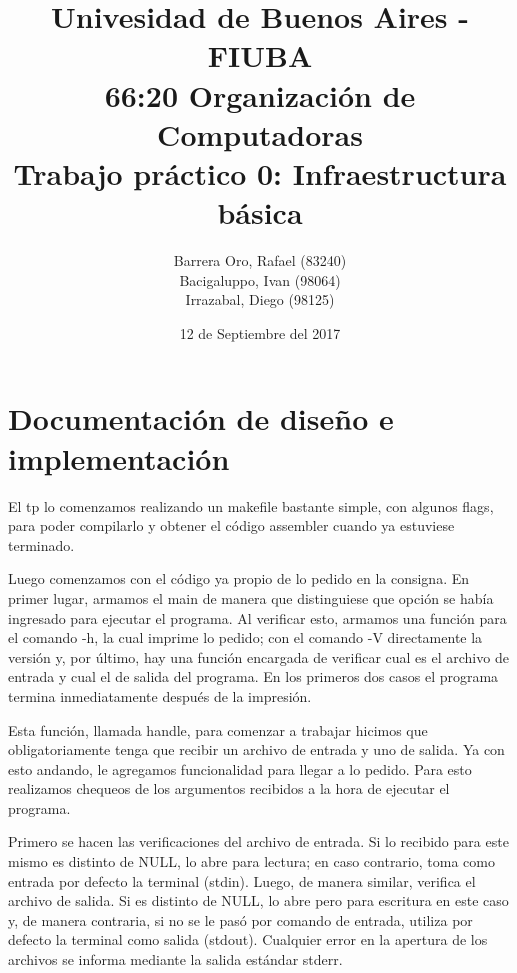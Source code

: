 \documentclass[10pt,a4paper]{article}
\begin{document}
\date{12 de Septiembre del 2017}

\title{Univesidad de Buenos Aires - FIUBA \\ 66:20 Organización de Computadoras \\ Trabajo práctico 0: Infraestructura básica}

\author{Barrera Oro, Rafael (83240) \\ Bacigaluppo, Ivan (98064) \\ Irrazabal, Diego (98125)}

\maketitle

\thispagestyle{empty}

\newpage

\setcounter{page}{1}

\tableofcontents

\newpage

\section{Documentación de diseño e implementación}

El tp lo comenzamos realizando un makefile bastante simple, con algunos flags, para poder compilarlo y obtener el código assembler cuando ya estuviese terminado. 

Luego comenzamos con el código ya propio de lo pedido en la consigna. En primer lugar, armamos el main de manera que distinguiese que opción se había ingresado para ejecutar el programa. Al verificar esto, armamos una función para el comando -h, la cual imprime lo pedido; con el comando -V directamente la versión y, por último, hay una función encargada de verificar cual es el archivo de entrada y cual el de salida del programa. En los primeros dos casos el programa termina inmediatamente después de la impresión.

Esta función, llamada handle, para comenzar a trabajar hicimos que obligatoriamente tenga que recibir un archivo de entrada y uno de salida. Ya con esto andando, le agregamos funcionalidad para llegar a lo pedido. Para esto realizamos chequeos de los argumentos recibidos a la hora de ejecutar el programa.

Primero se hacen las verificaciones del archivo de entrada. Si lo recibido para este mismo es distinto de NULL, lo abre para lectura; en caso contrario, toma como entrada por defecto la terminal (stdin). Luego, de manera similar, verifica el archivo de salida. Si es distinto de NULL, lo abre pero para escritura en este caso y, de manera contraria, si no se le pasó por comando de entrada, utiliza por defecto la terminal como salida (stdout). Cualquier error en la apertura de los archivos se informa mediante la salida estándar stderr.
\end{document}
